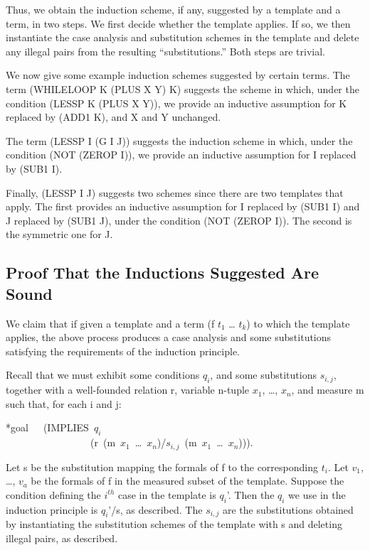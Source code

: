 \documentclass[11pt]{book}
\newenvironment{pubasis}{\begin{flushleft}\ttfamily\small}{\normalsize\rmfamily\end{flushleft}}
\newcommand{\pubdefaulttextsize}{\large}
\begin{document}
Thus, we obtain the induction scheme, if any, suggested by a template and
a term, in two steps.  We first decide whether the template applies.
If so, we then instantiate the case analysis and substitution schemes in the template
and delete any illegal pairs from the resulting ``substitutions.''
Both steps are trivial.

We now give some example induction schemes suggested by certain terms.
The term (WHILELOOP K (PLUS X Y) K) suggests the scheme in which, under
the condition (LESSP K (PLUS X Y)), we provide an inductive assumption
for K replaced by (ADD1 K), and X and Y unchanged.

The term (LESSP I (G I J)) suggests the induction scheme in which, under the
condition (NOT (ZEROP I)), we provide an inductive assumption for I replaced
by (SUB1 I).

Finally, (LESSP I J) suggests two schemes since there are two templates that
apply.  The first provides an inductive assumption for I replaced by (SUB1 I)
and J replaced by (SUB1 J), under the condition (NOT (ZEROP I)).  The
second is the symmetric one for J.
\subsection{Proof That the Inductions Suggested Are Sound}
\pubdefaulttextsize
We claim that if given a template and a term (f $t_{1}$ \ldots{} $t_{k}$) to
which the template applies, the above process produces a case analysis
and some substitutions satisfying the requirements of the induction
principle.

Recall that we must exhibit some conditions $q_{i}$, and some substitutions $s_{i,j}$,
together with a well-founded relation r, variable n-tuple $x_{1}$, \ldots{}, $x_{n}$, and
measure m such that, for each i and j:
\begin{pubasis}
*goal~~~(IMPLIES~$q_{i}$\\
~~~~~~~~~~~~~~~~~(r~(m~$x_{1}$~\ldots{}~$x_{n}$)/$s_{i,j}$~(m~$x_{1}$~\ldots{}~$x_{n}$))).\\
\end{pubasis}
Let s be the substitution mapping the formals of f to the corresponding
$t_{i}$.  Let $v_{1}$, \ldots{}, $v_{a}$ be the formals of f in the measured
subset of the template.  Suppose the condition defining the $i^{th}$ case
in the template is $q_{i}$'.  Then the $q_{i}$ we use in the induction
principle is $q_{i}$'/s, as described.  The $s_{i,j}$ are the substitutions
obtained by instantiating the substitution schemes of the template with
s and deleting illegal pairs, as described.
\end{document}
